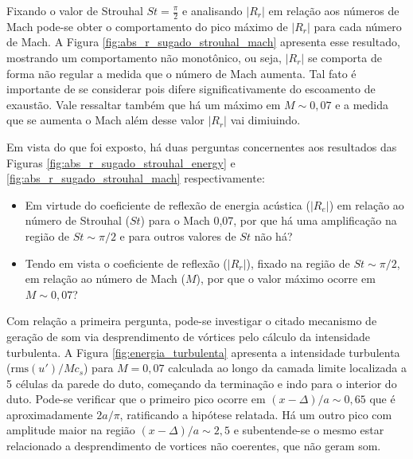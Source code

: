 \begin{figure}[ht!]
\centering
  
\end{figure}

Fixando o valor de Strouhal $St = \frac{\pi}{2}$ e analisando $|R_{r}|$ em relação aos números de Mach pode-se obter o comportamento do pico máximo de $|R_{r}|$ para cada número de Mach. A Figura \ref{fig:abs_r_sugado_strouhal_mach} apresenta esse resultado, mostrando um comportamento não monotônico, ou seja, $|R_{r}|$ se comporta de forma não regular a medida que o número de Mach aumenta. Tal fato é importante de se considerar pois difere significativamente do escoamento de exaustão. Vale ressaltar também que há um máximo em $M \sim 0,07$ e a medida que se aumenta o Mach além desse valor $|R_{r}|$ vai dimiuindo.

\begin{figure}[ht!]
\centering
  
\end{figure}

Em vista do que foi exposto, há duas perguntas concernentes aos resultados das Figuras \ref{fig:abs_r_sugado_strouhal_energy} e \ref{fig:abs_r_sugado_strouhal_mach} respectivamente:
\begin{itemize}
  \item Em virtude do coeficiente de reflexão de energia acústica ($|R_{e}|$) em relação ao número de Strouhal ($St$) para o Mach 0,07, por que há uma amplificação na região de $St \sim \pi/2$ e para outros valores de $St$ não há?
  \item Tendo em vista o coeficiente de reflexão ($|R_{r}|$), fixado na região de $St \sim \pi/2$, em relação ao número de Mach ($M$), por que o valor máximo ocorre em $M \sim 0,07$?
\end{itemize}

Com relação a primeira pergunta, pode-se investigar o citado mecanismo de geração de som via desprendimento de vórtices pelo cálculo da intensidade turbulenta. A Figura \ref{fig:energia_turbulenta} apresenta a intensidade turbulenta ($\text{rms}(u')/Mc_{s}$) para $M = 0,07$ calculada ao longo da camada limite localizada a 5 células da parede do duto, começando da terminação e indo para o interior do duto. Pode-se verificar que o primeiro pico ocorre em $(x - \Delta)/a \sim 0,65$ que é aproximadamente $2a/\pi$, ratificando a hipótese relatada. Há um outro pico com amplitude maior na região $(x - \Delta)/a \sim 2,5$ e subentende-se o mesmo estar relacionado a desprendimento de vortices não coerentes, que não geram som.      

